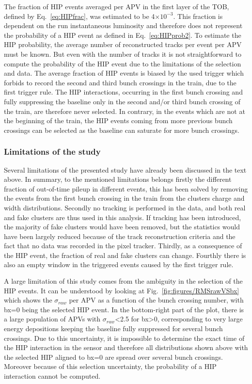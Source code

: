 The fraction of HIP events averaged per APV in the first layer of the TOB, defined by Eq.~\ref{eq:HIPfrac}, was estimated to be 4$\times 10^{-3}$. This fraction is dependent on the run instantaneous luminosity and therefore does not represent the probability of a HIP event as defined in Eq.~\ref{eq:HIPprob2}. To estimate the HIP probability, the average number of reconstructed tracks per event per APV must be known. But even with the number of tracks it is not straightforward to compute the probability of the HIP event due to the limitations of the selection and data. The average fraction of HIP events is biased by the used trigger which forbids to record the second and third bunch crossings in the train, due to the first trigger rule. The HIP interactions, occurring in the first bunch crossing and fully suppressing the baseline only in the second and/or third bunch crossing of the train, are therefore never selected. In contrary, in the events which are not at the beginning of the train, the HIP events coming from more previous bunch crossings can be selected as the baseline can saturate for more bunch crossings.
 

\subsubsection{Limitations of the study~\label{sec:limitationsSelection}}
Several limitations of the presented study have already been discussed in the text above. In summary, to the mentioned limitations belongs firstly the different fraction of out-of-time pileup in different events, this has been solved by removing the events from the first bunch crossing in the train from the clusters charge and width distributions. Secondly no tracking is performed in the data, and both real and fake clusters are thus used in this analysis. If tracking has been introduced, the majority of fake clusters would have  been removed, but the statistics would have been largely reduced because of the track reconstruction criteria and the fact that no data was recorded in the pixel tracker. Thirdly, as a consequence of the HIP event, the fraction of real and fake clusters can change. Fourthly there is also an empty window in the triggered events caused by the first trigger rule.

A large limitation of this study comes from the ambiguity in the selection of the HIP events. It can be understood by looking at Fig.~\ref{fig:figures/RMSrawVSbx} which shows the $\sigma_{raw}$ per APV as a function of the bunch crossing number, with bx=0 being the selected HIP event. In the bottom-right part of the plot, there is a large population of APVs with $\sigma_{raw}$<2.5 for bx>0, corresponding to very large energy depositions keeping the baseline fully suppressed for several bunch crossings. Due to this uncertainty, it is impossible to determine the exact time of the HIP interaction in the sensor and therefore all distributions shown above with the selected HIP aligned to bx=0 are spread over several bunch crossings. Moreover because of this selection uncertainty, the probability of a HIP interaction cannot be computed. 

